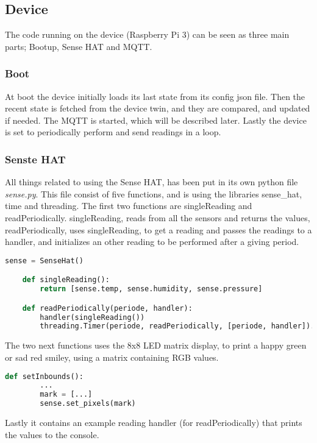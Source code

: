 \subsection{Device}
The code running on the device (Raspberry Pi 3) can be seen as three main parts; Bootup, Sense HAT and MQTT.

\subsubsection*{Boot}
At boot the device initially loads its last state from its config json file. Then the recent state is fetched from the device twin, and they are compared, and updated if needed. The MQTT is started, which will be described later. Lastly the device is set to periodically perform and send readings in a loop. 

\subsubsection*{Senste HAT}
All things related to using the Sense HAT, has been put in its own python file \textit{sense.py}. This file consist of five functions, and is using the libraries sense\_hat, time and threading.
The first two functions are singleReading and readPeriodically. singleReading, reads from all the sensors and returns the values, readPeriodically, uses singleReading, to get a reading and passes the readings to a handler, and initializes an other reading to be performed after a giving period.
\begin{lstlisting}[language=Python, caption=Python reading from sensehat, label={lst:rprfsh}, basicstyle=\scriptsize]
    sense = SenseHat()

    def singleReading():
        return [sense.temp, sense.humidity, sense.pressure]   

    def readPeriodically(periode, handler): 
        handler(singleReading())
        threading.Timer(periode, readPeriodically, [periode, handler]).start()
\end{lstlisting}
The two next functions uses the 8x8 LED matrix display, to print a happy green or sad red smiley, using a matrix containing RGB values.
\begin{lstlisting}[language=Python, caption=example of setting LED matrix, label={lst:rpslm}, basicstyle=\scriptsize]
    def setInbounds():
        ...
        mark = [...]
        sense.set_pixels(mark)
\end{lstlisting}
Lastly it contains an example reading handler (for readPeriodically) that prints the values to the console.

